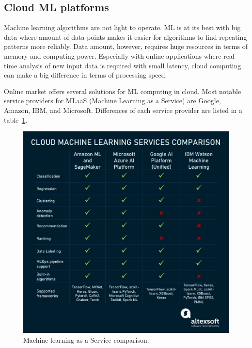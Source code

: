 
\subsection{Cloud ML platforms}\label{subsec:bg-cloud-ml-platforms}

Machine learning algorithms are not light to operate.
ML is at its best with big data
where amount of data points
makes it easier for algorithms
to find repeating patterns more reliably.\cite{zhou2017machine}
Data amount, however,
requires huge resources in terms of memory and computing power.
Especially with online applications
where real time analysis of new input data is required
with small latency,
cloud computing can make a big difference
in terms of processing speed.

Online market offers several solutions for ML computing in cloud.
Most notable service providers for
MLaaS (Machine Learning as a Service)
are Google, Amazon, IBM, and Microsoft.
Differences of each service provider are listed in a table~\ref{fig:mlaas-comparison}.

\begin{figure}[htb]
    \centering
    \includegraphics[width=150mm]{./appendices/mlaas-comparison}
    \caption{Machine learning as a Service comparison.~\cite{altexsoft2021mlaas}
    \label{fig:mlaas-comparison}}
\end{figure}

